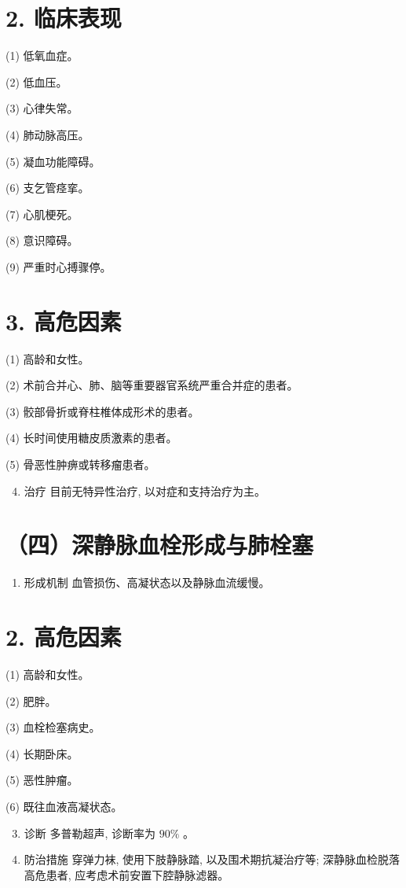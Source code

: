 \documentclass[10pt]{article}
\begin{document}
\section*{2. 临床表现}
(1) 低氧血症。

(2) 低血压。

(3) 心律失常。

(4) 肺动脉高压。

(5) 凝血功能障碍。

(6) 支乞管痉挛。

(7) 心肌梗死。

(8) 意识障碍。

(9) 严重时心搏骤停。

\section*{3. 高危因素}
(1) 高龄和女性。

(2) 术前合并心、肺、脑等重要器官系统严重合并症的患者。

(3) 骹部骨折或脊柱椎体成形术的患者。

(4) 长时间使用糖皮质激素的患者。

(5) 骨恶性肿痹或转移瘤患者。

\begin{enumerate}
  \setcounter{enumi}{3}
  \item 治疗 目前无特异性治疗, 以对症和支持治疗为主。
\end{enumerate}

\section*{（四）深静脉血栓形成与肺栓塞}
\begin{enumerate}
  \item 形成机制 血管损伤、高凝状态以及静脉血流缓慢。
\end{enumerate}

\section*{2. 高危因素}
(1) 高龄和女性。

(2) 肥胖。

(3) 血栓检塞病史。

(4) 长期卧床。

(5) 恶性肿瘤。

(6) 既往血液高凝状态。

\begin{enumerate}
  \setcounter{enumi}{2}
  \item 诊断 多普勒超声, 诊断率为 $90 \%$ 。

  \item 防治措施 穿弹力袜, 使用下肢静脉踏, 以及围术期抗凝治疗等; 深静脉血检脱落高危患者, 应考虑术前安置下腔静脉滤器。

\end{enumerate}
\end{document}
